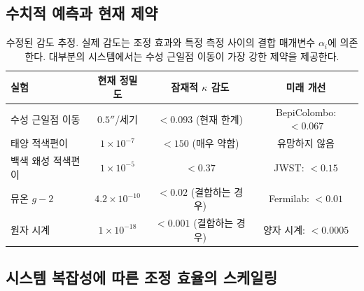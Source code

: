 \documentclass[11pt,a4paper]{article}
\begin{document}
\subsection{수치적 예측과 현재 제약}

\begin{table}[htbp]
\centering
\small
\begin{tabular}{lccc}
	\toprule
	\textbf{실험} & \textbf{현재 정밀도} & \textbf{잠재적 $\kappa$ 감도} & \textbf{미래 개선} \\
	\midrule
	수성 근일점 이동 & $0.5''$/세기 & $<0.093$ (현재 한계) & BepiColombo: $<0.067$ \\
	태양 적색편이 & $1\times10^{-7}$ & $<150$ (매우 약함) & 유망하지 않음 \\
	백색 왜성 적색편이 & $1\times10^{-5}$ & $<0.37$ & JWST: $<0.15$ \\
	뮤온 $g-2$ & $4.2\times10^{-10}$ & $<0.02$ (결합하는 경우) & Fermilab: $<0.01$ \\
	원자 시계 & $1\times10^{-18}$ & $<0.001$ (결합하는 경우) & 양자 시계: $<0.0005$ \\
	\bottomrule
\end{tabular}
\caption{수정된 감도 추정. 실제 감도는 조정 효과와 특정 측정 사이의 결합 매개변수 $\alpha_i$에 의존한다. 대부분의 시스템에서는 수성 근일점 이동이 가장 강한 제약을 제공한다.}
\end{table}

\subsection{시스템 복잡성에 따른 조정 효율의 스케일링}
\end{document}

